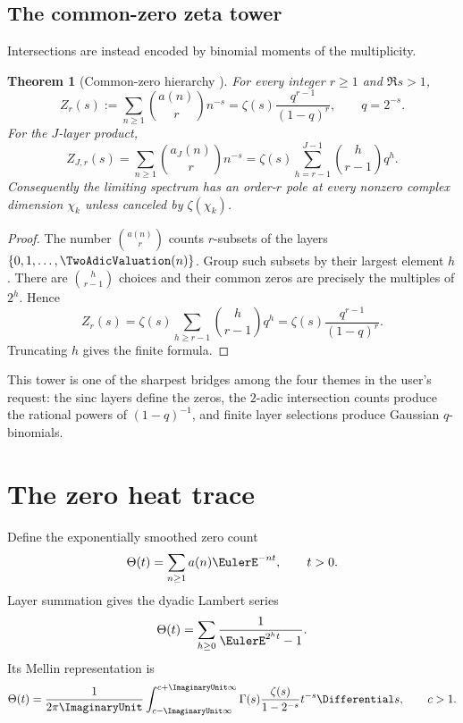 \documentclass[11pt]{article}
\numberwithin{equation}{section}
\newtheorem{theorem}{Theorem}[section]
\theoremstyle{definition}
\theoremstyle{remark}
\begin{document}
\subsection{The common-zero zeta tower}

Intersections are instead encoded by binomial moments of the multiplicity.

\begin{theorem}[Common-zero hierarchy \NewResult]
\label{p2:thm:common-zero}
For every integer $r\ge1$ and $\Re s>1$,
\begin{equation}
 Z_r(s):=\sum_{n\ge1}\binom{a(n)}r n^{-s}
 =\zeta(s)\frac{q^{r-1}}{(1-q)^r},\qquad q=2^{-s}.         \label{p2:eq:Zr}
\end{equation}
For the $J$-layer product,
\begin{equation}
 Z_{J,r}(s)=\sum_{n\ge1}\binom{a_J(n)}r n^{-s}
 =\zeta(s)\sum_{h=r-1}^{J-1}\binom{h}{r-1}q^h.           \label{p2:eq:ZJr}
\end{equation}
Consequently the limiting spectrum has an order-$r$ pole at every nonzero
complex dimension $\chi_k$ unless canceled by $\zeta(\chi_k)$.
\end{theorem}

\begin{proof}
The number $\binom{a(n)}r$ counts $r$-subsets of the layers
$\{0,1,\ldots,\TwoAdicValuation(n)\}$.  Group such subsets by their largest element $h$.
There are $\binom{h}{r-1}$ choices and their common zeros are precisely the
multiples of $2^h$.  Hence
\[
 Z_r(s)=\zeta(s)\sum_{h\ge r-1}\binom{h}{r-1}q^h
 =\zeta(s)\frac{q^{r-1}}{(1-q)^r}.
\]
Truncating $h$ gives the finite formula.
\end{proof}

This tower is one of the sharpest bridges among the four themes in the user's
request: the sinc layers define the zeros, the $2$-adic intersection counts
produce the rational powers of $(1-q)^{-1}$, and finite layer selections produce
Gaussian $q$-binomials.

\section{The zero heat trace}
\label{p2:sec:heat}

Define the exponentially smoothed zero count
\begin{equation}
 \Theta(t)=\sum_{n\ge1}a(n)\EulerE^{-nt},\qquad t>0.            \label{p2:eq:Theta}
\end{equation}
Layer summation gives the dyadic Lambert series
\begin{equation}
 \Theta(t)=\sum_{h\ge0}\frac1{\EulerE^{2^ht}-1}.               \label{p2:eq:Theta-Lambert}
\end{equation}
Its Mellin representation is
\begin{equation}
 \Theta(t)=\frac1{2\pi\ImaginaryUnit}\int_{c-\ImaginaryUnit\infty}^{c+\ImaginaryUnit\infty}
 \Gamma(s)\frac{\zeta(s)}{1-2^{-s}}t^{-s}\Differential s,
 \qquad c>1.                                               \label{p2:eq:Theta-Mellin}
\end{equation}
\end{document}
